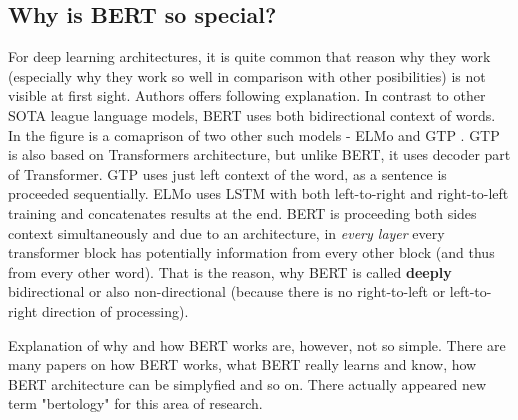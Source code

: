  \subsection{Why is BERT so special?}
 \label{sub:specialBert}
For deep learning architectures, it is quite common that reason why they work (especially why they work so well in comparison with other posibilities) is not visible at first sight. Authors offers following explanation. In contrast to other SOTA  league language models, BERT uses both bidirectional context of words. In the figure %
is a comaprison of two other such models - ELMo and GTP %
. GTP is also based on Transformers architecture, but unlike BERT, it uses decoder part of Transformer. 
GTP uses just left context of the word, as a sentence is proceeded sequentially. ELMo uses LSTM %
with both left-to-right and right-to-left training and concatenates results at the end. BERT is proceeding both sides context simultaneously and due to an architecture, in \textit{every layer} every transformer block has potentially information from every other block (and thus from every other word). That is the reason, why BERT is called \textbf{deeply} bidirectional or also non-directional (because there is no right-to-left or left-to-right direction of processing).
\par
Explanation of why and how BERT works are, however, not so simple. There are many papers on how BERT works, what BERT really learns and know, how BERT architecture can be simplyfied and so on. There actually appeared new term "bertology" for this area of research.
 

